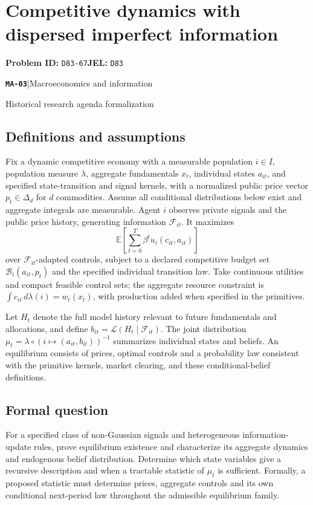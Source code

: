 \documentclass[11pt,a4paper]{article}
\newcommand{\E}{\mathbb E}
\newcommand{\entrymeta}[3]{{\sffamily\small\color{muted}\textbf{\texttt{#1}}\quad|\quad #2\par #3\par}}
\begin{document}
\section*{Competitive dynamics with dispersed imperfect information}
\textbf{Problem ID:} \texttt{D83-67}\quad \textbf{JEL:} \texttt{D83}\par
\label{problem:OP-0584}
\label{beyond:MA-03}
\entrymeta{MA-03}{Macroeconomics and information}{Historical research agenda formalization}
\subsection*{Definitions and assumptions}
Fix a dynamic competitive economy with a measurable population $i\in I$, population measure $\lambda$, aggregate fundamentals $x_t$, individual states $a_{it}$, and specified state-transition and signal kernels, with a normalized public price vector $p_t\in\Delta_d$ for $d$ commodities. Assume all conditional distributions below exist and aggregate integrals are measurable. Agent $i$ observes private signals and the public price history, generating information $\mathcal F_{it}$. It maximizes
\[
 \E\left[\sum_{t=0}^{T}\beta^tu_i(c_{it},a_{it})\right]
\]
over $\mathcal F_{it}$-adapted controls, subject to a declared competitive budget set $\mathcal B_i(a_{it},p_t)$ and the specified individual transition law. Take continuous utilities and compact feasible control sets; the aggregate resource constraint is $\int c_{it}\,d\lambda(i)=w_t(x_t)$, with production added when specified in the primitives.

Let $H_t$ denote the full model history relevant to future fundamentals and allocations, and define $b_{it}=\mathcal L(H_t\mid\mathcal F_{it})$. The joint distribution $\mu_t=\lambda\circ(i\mapsto(a_{it},b_{it}))^{-1}$ summarizes individual states and beliefs. An equilibrium consists of prices, optimal controls and a probability law consistent with the primitive kernels, market clearing, and these conditional-belief definitions.
\subsection*{Formal question}
For a specified class of non-Gaussian signals and heterogeneous information-update rules, prove equilibrium existence and characterize its aggregate dynamics and endogenous belief distribution. Determine which state variables give a recursive description and when a tractable statistic of $\mu_t$ is sufficient. Formally, a proposed statistic must determine prices, aggregate controls and its own conditional next-period law throughout the admissible equilibrium family.
\end{document}

